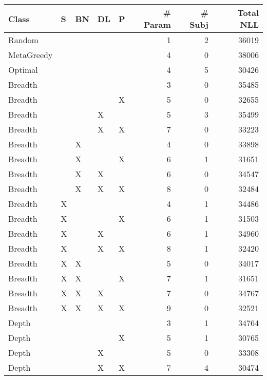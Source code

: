 \begin{tabular}{lllllrrr}
\toprule
      Class &  S & BN & DL &  P &  \# Param &  \# Subj &  Total NLL \\
\midrule
     Random &    &    &    &    &        1 &       2 &      36019 \\
 MetaGreedy &    &    &    &    &        4 &       0 &      38006 \\
    Optimal &    &    &    &    &        4 &       5 &      30426 \\
    Breadth &    &    &    &    &        3 &       0 &      35485 \\
    Breadth &    &    &    &  X &        5 &       0 &      32655 \\
    Breadth &    &    &  X &    &        5 &       3 &      35499 \\
    Breadth &    &    &  X &  X &        7 &       0 &      33223 \\
    Breadth &    &  X &    &    &        4 &       0 &      33898 \\
    Breadth &    &  X &    &  X &        6 &       1 &      31651 \\
    Breadth &    &  X &  X &    &        6 &       0 &      34547 \\
    Breadth &    &  X &  X &  X &        8 &       0 &      32484 \\
    Breadth &  X &    &    &    &        4 &       1 &      34486 \\
    Breadth &  X &    &    &  X &        6 &       1 &      31503 \\
    Breadth &  X &    &  X &    &        6 &       1 &      34960 \\
    Breadth &  X &    &  X &  X &        8 &       1 &      32420 \\
    Breadth &  X &  X &    &    &        5 &       0 &      34017 \\
    Breadth &  X &  X &    &  X &        7 &       1 &      31651 \\
    Breadth &  X &  X &  X &    &        7 &       0 &      34767 \\
    Breadth &  X &  X &  X &  X &        9 &       0 &      32521 \\
      Depth &    &    &    &    &        3 &       1 &      34764 \\
      Depth &    &    &    &  X &        5 &       1 &      30765 \\
      Depth &    &    &  X &    &        5 &       0 &      33308 \\
      Depth &    &    &  X &  X &        7 &       4 &      30474 \\

\end{tabular}
